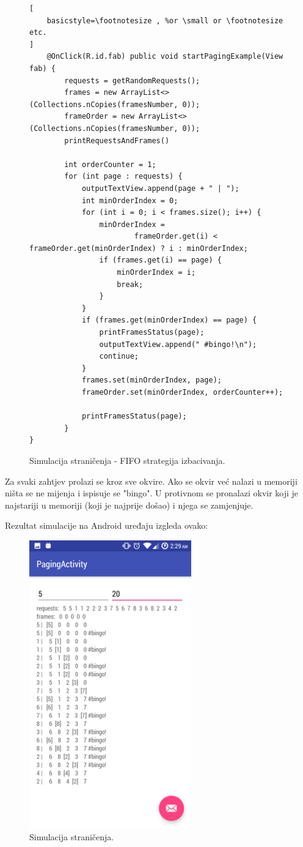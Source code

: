\documentclass[times, utf8, zavrsni]{fer}
\begin{document}
\begin{figure}[ht!]
\begin{lstlisting}[
    basicstyle=\footnotesize , %or \small or \footnotesize etc.
]
    @OnClick(R.id.fab) public void startPagingExample(View fab) {
        requests = getRandomRequests();
        frames = new ArrayList<>(Collections.nCopies(framesNumber, 0));
        frameOrder = new ArrayList<>(Collections.nCopies(framesNumber, 0));	
		printRequestsAndFrames()
		
        int orderCounter = 1;
        for (int page : requests) {
            outputTextView.append(page + " | ");
            int minOrderIndex = 0;
            for (int i = 0; i < frames.size(); i++) {
                minOrderIndex =
                        frameOrder.get(i) < frameOrder.get(minOrderIndex) ? i : minOrderIndex;
                if (frames.get(i) == page) {
                    minOrderIndex = i;
                    break;
                }
            }
            if (frames.get(minOrderIndex) == page) {
                printFramesStatus(page);
                outputTextView.append(" #bingo!\n");
                continue;
            }
            frames.set(minOrderIndex, page);
            frameOrder.set(minOrderIndex, orderCounter++);

            printFramesStatus(page);
        }
}
\end{lstlisting}
\caption{Simulacija straničenja - FIFO strategija izbacivanja.}
\label{overflow}
\end{figure}
Za svaki zahtjev prolazi se kroz sve okvire. Ako se okvir već nalazi u memoriji ništa se ne mijenja i ispisuje se "bingo". U protivnom se pronalazi okvir koji je najstariji u memoriji (koji je najprije došao) i njega se zamjenjuje.\newpage

Rezultat simulacije na Android uređaju izgleda ovako:
\begin{figure}[ht!]
\centering
\includegraphics[width=70mm]{img/PagingActivity.png}
\caption{Simulacija straničenja.}
\label{overflow}
\end{figure}
\end{document}
